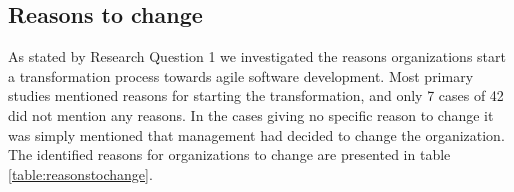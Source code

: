 \documentclass[preprint,authoryear,12pt]{elsarticle}
\begin{document}
\subsection{Reasons to change}

As stated by Research Question 1 we investigated the reasons organizations start
a transformation process towards agile software development. Most primary
studies mentioned reasons for starting the transformation, and only 7 cases of
42 did not mention any reasons. In the cases giving no specific reason to change
it was simply mentioned that management had decided to change the organization.
The identified reasons for organizations to change are presented in table
\ref{table:reasonstochange}.


\end{document}
